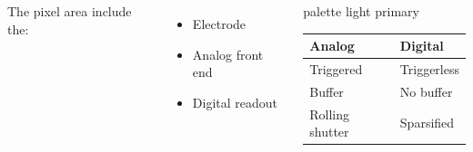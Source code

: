 \begin{frame}
            \begin{columns}
                    The pixel area include the:
                    \begin{itemize}
                        \item Electrode
                        \item Analog front end
                        \item Digital readout 
                    \end{itemize} 
                    \vspace*{-0.15cm}%
                    \begin{beamercolorbox}[rounded=true, center]{palette light primary}
                        \setlength{\tabcolsep}{0.5em} %
                        {\renewcommand{\arraystretch}{1.2}%
                        \begin{tabular}{l|l}
                            Analog & Digital\\
                            \hline
                            Triggered & Triggerless\\
                            \hline
                            Buffer & No buffer \\
                            \hline
                            Rolling shutter & Sparsified\\
                        \end{tabular}
                        }
                    \end{beamercolorbox}
            \end{columns}
    \end{frame} 


